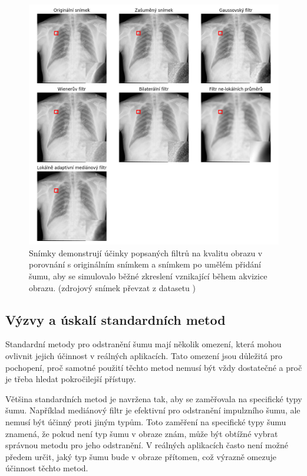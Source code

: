 \documentclass[male,czech,api_ing]{thesis}
\begin{document}
\begin{figure}[H]
    \centering
    \includegraphics[width=\linewidth]{Prilohy/Obrazky/NoiseReduction.png}
    \caption{Snímky demonstrují účinky popsaných filtrů na kvalitu obrazu v porovnání s originálním snímkem a snímkem po umělém přidání šumu, aby se simulovalo běžné zkreslení vznikající během akvizice obrazu. (zdrojový snímek převzat z datasetu \cite{LungDataset})}
    \label{fig:noise_reduction_filters}
\end{figure}

\subsection{Výzvy a úskalí standardních metod}
Standardní metody pro odstranění šumu mají několik omezení, která mohou ovlivnit jejich účinnost v reálných aplikacích. Tato omezení jsou důležitá pro pochopení, proč samotné použití těchto metod nemusí být vždy dostatečné a proč je třeba hledat pokročilejší přístupy.

Většina standardních metod je navržena tak, aby se zaměřovala na specifické typy šumu. Například mediánový filtr je efektivní pro odstranění impulzního šumu, ale nemusí být účinný proti jiným typům. Toto zaměření na specifické typy šumu znamená, že pokud není typ šumu v obraze znám, může být obtížné vybrat správnou metodu pro jeho odstranění. V reálných aplikacích často není možné předem určit, jaký typ šumu bude v obraze přítomen, což výrazně omezuje účinnost těchto metod.
\end{document}
